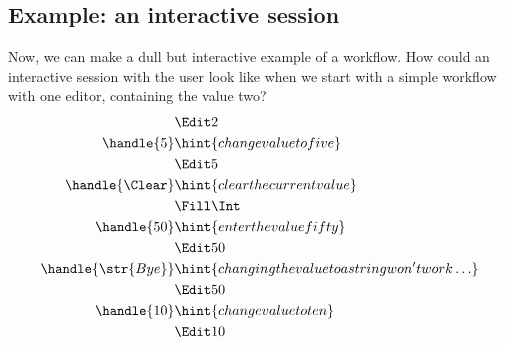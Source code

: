 \subsection{Example: an interactive session}

Now, we can make a dull but interactive example of a workflow.
How could an interactive session with the user look like when we start with a simple workflow with one editor,
containing the value two?
\begin{align*}
    & \Edit 2 \\
  \handle{5} & \hint{change value to five} \\
    & \Edit 5 \\
  \handle{\Clear} & \hint{clear the current value} \\
    & \Fill \Int \\
  \handle{50} & \hint{enter the value fifty} \\
    & \Edit 50 \\
  \handle{\str{Bye}} & \hint{changing the value to a string won't work\ldots} \\
    & \Edit 50 \\
  \handle{10} & \hint{change value to ten} \\
    & \Edit 10
\end{align*}
